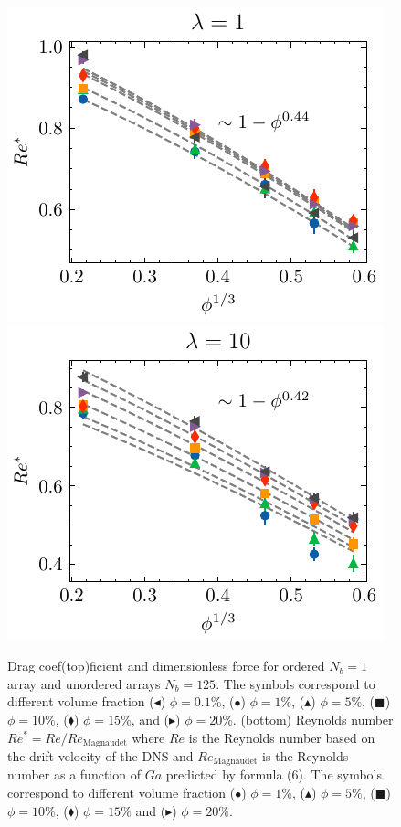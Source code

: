 \begin{figure}[h!]
    \includegraphics[height = 0.35\textwidth]{image/HOMOGENEOUS/fCA/Re_iso_N_5_l_1.pdf}
    \includegraphics[height = 0.35\textwidth]{image/HOMOGENEOUS/fCA/Re_iso_N_5_l_10.pdf}
    \caption{
        Drag coef(top)ficient and dimensionless force for ordered $N_b=1$ array and unordered arrays $N_b=125$. 
        The symbols correspond to different volume fraction ($\blacktriangleleft$) $\phi = 0.1$\%, ($\bullet$) $\phi = 1\%$, ($\blacktriangle$) $\phi = 5\%$, ($\blacksquare$) $\phi = 10\%$, ($\blacklozenge$) $\phi = 15\%$, and ($\blacktriangleright$) $\phi = 20$\%.
        (bottom) Reynolds number $Re^* = Re / Re_\text{Magnaudet}$ where $Re$ is the Reynolds number based on the drift velocity of the DNS and $Re_\text{Magnaudet}$ is the Reynolds number as a function of $Ga$ predicted by \citet{magnaudet1997forces} formula (6).  
        The symbols correspond to different volume fraction ($\bullet$) $\phi = 1\%$, ($\blacktriangle$) $\phi = 5\%$, ($\blacksquare$) $\phi = 10\%$, ($\blacklozenge$) $\phi = 15\%$ and ($\blacktriangleright$) $\phi = 20\%$.
    }
    \label{fig:Cp}
\end{figure}

